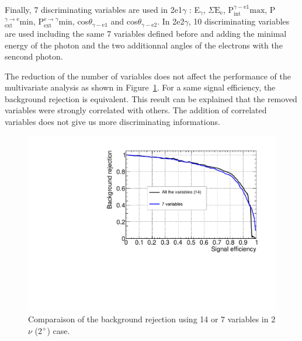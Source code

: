 \documentclass[main.tex]{subfiles}
\begin{document}
\bigskip


\NI Finally, 7 discriminating variables are used in 2e1$\gamma$ : E$_{\gamma}$, $\Sigma\text{E}_\text{e}$, P$_{\text{int}}^{\gamma-\text{e1}} \text{max}$, P$_{\text{ext}}^{\gamma \rightarrow \text{e}} \text{min}$, P$_{\text{ext}}^{\text{e} \rightarrow \gamma} \text{min}$, cos$\theta_{\gamma-\text{e1}}$ and cos$\theta_{\gamma-\text{e2}}$. In 2e2$\gamma$, 10 discriminating variables are used including the same 7 variables defined before and adding the minimal energy of the photon and the two additionnal angles of the electrons with the sencond photon. 


\bigskip


\NI The reduction of the number of variables does not affect the performance of the multivariate analysis as shown in Figure~\ref{CompareTMVA}. For a same signal efficiency, the background rejection is equivalent. This result can be explained that the removed variables were strongly correlated with others. The addition of correlated variables does not give us more discriminating informations.




\begin{figure} [h!]
\begin{center}
\includegraphics[scale=0.6]{pictures/FinalResults/bb2nu2/150/preselection/CompareTMVAReductionVar.pdf}
\end{center}
\caption{Comparaison of the background rejection using 14 or 7 variables in 2$\nu$ (2$^+$) case.}
\label{CompareTMVA}
\end{figure}


\FloatBarrier
\end{document}
